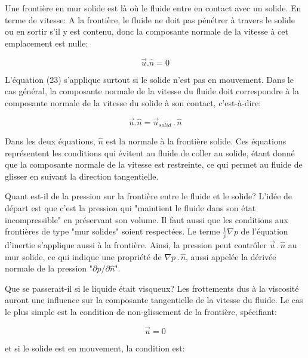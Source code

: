 \documentclass[11pt]{report}
\begin{document}
Une frontière en mur solide est là où le fluide entre en contact avec un solide. En terme de vitesse: A la frontière, le fluide ne doit pas pénétrer à travers le solide ou en sortir s'il y est contenu, donc la composante normale de la vitesse à cet emplacement est nulle:

\begin{equation}
\overrightarrow{u}.\hat{n} = 0
\end{equation}

L'équation (23) s'applique surtout si le solide n'est pas en mouvement. Dans le cas général, la composante normale de la vitesse du fluide doit correspondre à la composante normale de la vitesse du solide à son contact, c'est-à-dire:

\begin{equation}
\overrightarrow{u}.\hat{n} = \overrightarrow{u}\!\!_{solid} \,.\, \hat{n}
\end{equation}

Dans les deux équations, $ \hat{n} $ est la normale à la frontière solide.
Ces équations représentent les conditions qui évitent au fluide de coller au solide, étant donné que la composante normale de la vitesse est restreinte, ce qui permet au fluide de glisser en suivant la direction tangentielle.\newline

Quant est-il de la pression sur la frontière entre le fluide et le solide? L'idée de départ est que c'est la pression qui "maintient le fluide dans son état incompressible" en préservant son volume. Il faut aussi que les conditions aux frontières de type "mur solides" soient respectées. Le terme $ \frac{1}{\rho}\nabla p$ de l'équation d'inertie s'applique aussi à la frontière. Ainsi, la pression peut contrôler $  \overrightarrow{u} \,.\, \hat{n} $ au mur solide, ce qui indique une propriété de $ \nabla p \,.\, \hat{n} $, aussi appelée la dérivée normale de la pression "$ \partial p / \partial \hat{n} $".\newline

Que se passerait-il si le liquide était visqueux? Les frottements dus à la viscosité auront une influence sur la composante tangentielle de la vitesse du fluide. Le cas le plus simple est la condition de non-glissement de la frontière, spécifiant:

\begin{equation}
\overrightarrow{u} = 0
\end{equation}

et si le solide est en mouvement, la condition est:
\end{document}
